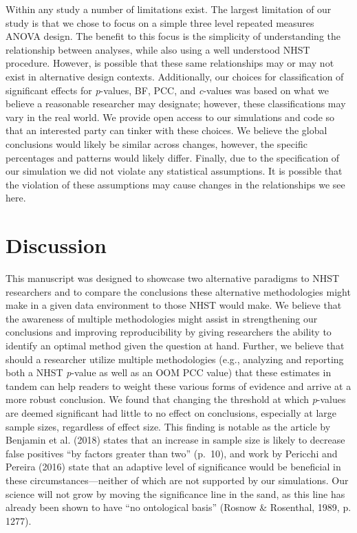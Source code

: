\documentclass[english,mask,man]{apa6}
\theoremstyle{definition}
\theoremstyle{definition}
\theoremstyle{definition}
\theoremstyle{remark}
\begin{document}
Within any study a number of limitations exist. The largest limitation
of our study is that we chose to focus on a simple three level repeated
measures ANOVA design. The benefit to this focus is the simplicity of
understanding the relationship between analyses, while also using a well
understood NHST procedure. However, is possible that these same
relationships may or may not exist in alternative design contexts.
Additionally, our choices for classification of significant effects for
\emph{p}-values, BF, PCC, and \emph{c}-values was based on what we
believe a reasonable researcher may designate; however, these
classifications may vary in the real world. We provide open access to
our simulations and code so that an interested party can tinker with
these choices. We believe the global conclusions would likely be similar
across changes, however, the specific percentages and patterns would
likely differ. Finally, due to the specification of our simulation we
did not violate any statistical assumptions. It is possible that the
violation of these assumptions may cause changes in the relationships we
see here.

\section{Discussion}\label{discussion}

This manuscript was designed to showcase two alternative paradigms to
NHST researchers and to compare the conclusions these alternative
methodologies might make in a given data environment to those NHST would
make. We believe that the awareness of multiple methodologies might
assist in strengthening our conclusions and improving reproducibility by
giving researchers the ability to identify an optimal method given the
question at hand. Further, we believe that should a researcher utilize
multiple methodologies (e.g., analyzing and reporting both a NHST
\emph{p}-value as well as an OOM PCC value) that these estimates in
tandem can help readers to weight these various forms of evidence and
arrive at a more robust conclusion. We found that changing the threshold
at which \emph{p}-values are deemed significant had little to no effect
on conclusions, especially at large sample sizes, regardless of effect
size. This finding is notable as the article by Benjamin et al. (2018)
states that an increase in sample size is likely to decrease false
positives \enquote{by factors greater than two} (p.~10), and work by
Pericchi and Pereira (2016) state that an adaptive level of significance
would be beneficial in these circumstances---neither of which are not
supported by our simulations. Our science will not grow by moving the
significance line in the sand, as this line has already been shown to
have \enquote{no ontological basis} (Rosnow \& Rosenthal, 1989, p.
1277).
\end{document}
